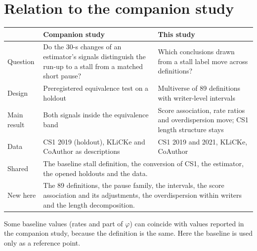 \section{Relation to the companion study}
\label{app:companion}

\begin{center}\footnotesize
\begin{tabularx}{\textwidth}{@{}l X X@{}}
\toprule
 & Companion study \cite{miura2026runup} & This study \\
\midrule
Question & Do the 30-s changes of an estimator's signals distinguish the run-up to a stall from a matched short
pause? & Which conclusions drawn from a stall label move across definitions? \\
Design & Preregistered equivalence test on a holdout & Multiverse of 89 definitions with writer-level intervals \\
Main result & Both signals inside the equivalence band & Score association, rate ratios and overdispersion move;
CS1 length structure stays \\
Data & CS1 2019 (holdout), KLiCKe and CoAuthor as descriptions & CS1 2019 and 2021, KLiCKe, CoAuthor \\
Shared & \multicolumn{2}{X}{The baseline stall definition, the conversion of CS1, the estimator, the opened holdouts
and the data.} \\
New here & \multicolumn{2}{X}{The 89 definitions, the pause family, the intervals, the score association and its
adjustments, the overdispersion within writers and the length decomposition.} \\
\bottomrule
\end{tabularx}
\end{center}

Some baseline values (rates and part of $\varphi$) can coincide with values reported in the companion study, because
the definition is the same. Here the baseline is used only as a reference point.
